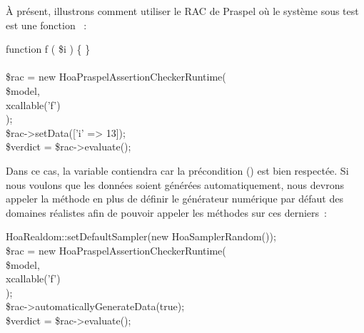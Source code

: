 À présent, illustrons comment utiliser le RAC de Praspel où le système sous test
est une fonction ~:
%
\begin{pre}
function f ( \$i ) \{ \} \\
 \\
\$rac = new Hoa\bslash{}Praspel\bslash{}AssertionChecker\bslash{}Runtime( \\
    \$model, \\
    xcallable('f') \\
); \\
\$rac->setData(['i' => 13]); \\
\$verdict = \$rac->evaluate();
\end{pre}
%
Dans ce cas, la variable  contiendra  car la
précondition () est bien respectée. Si nous voulons
que les données soient générées automatiquement, nous devrons appeler la méthode
 en plus de
définir le générateur numérique par défaut des domaines réalistes afin de
pouvoir appeler les méthodes  sur ces derniers~:
%
\begin{pre}
Hoa\bslash{}Realdom::setDefaultSampler(new Hoa\bslash{}Sampler\bslash{}Random()); \\
\$rac = new Hoa\bslash{}Praspel\bslash{}AssertionChecker\bslash{}Runtime( \\
    \$model, \\
    xcallable('f') \\
); \\
\$rac->automaticallyGenerateData(true); \\
\$verdict = \$rac->evaluate();
\end{pre}

